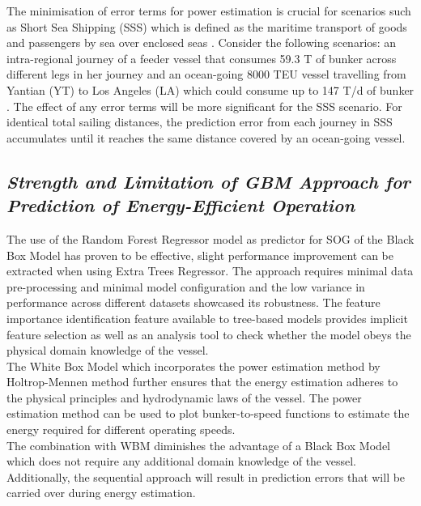 The minimisation of error terms for power estimation is crucial for scenarios such as Short Sea Shipping (SSS) which is defined as the maritime transport of goods and passengers by sea over enclosed seas . Consider the following scenarios: an intra-regional journey of a feeder vessel that consumes 59.3 T of bunker across different legs in her journey  and an ocean-going 8000 TEU vessel travelling from Yantian (YT) to Los Angeles (LA) which could consume up to 147 T/d of bunker . The effect of any error terms will be more significant for the SSS scenario. For identical total sailing distances, the prediction error from each journey in SSS accumulates until it reaches the same distance covered by an ocean-going vessel.\\

\subsection*{\emph{Strength and Limitation of GBM Approach for Prediction of Energy-Efficient Operation}}

The use of the Random Forest Regressor model as predictor for SOG of the Black Box Model has proven to be effective, slight performance improvement can be extracted when using Extra Trees Regressor. The approach requires minimal data pre-processing and minimal model configuration and the low variance in performance across different datasets showcased its robustness. The feature importance identification feature available to tree-based models provides implicit feature selection as well as an analysis tool to check whether the model obeys the physical domain knowledge of the vessel.\\

The White Box Model which incorporates the power estimation method by Holtrop-Mennen method further ensures that the energy estimation adheres to the physical principles and hydrodynamic laws of the vessel. The power estimation method can be used to plot bunker-to-speed functions to estimate the energy required for different operating speeds.\\

The combination with WBM diminishes the advantage of a Black Box Model which does not require any additional domain knowledge of the vessel. Additionally, the sequential approach will result in prediction errors that will be carried over during energy estimation.\\ 

